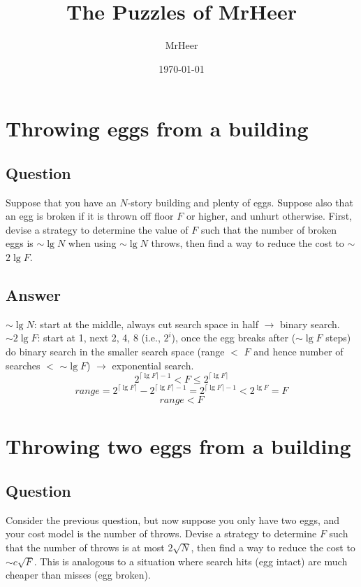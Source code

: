 \documentclass[12pt]{article}
\title{The Puzzles of MrHeer}
\author{MrHeer}
\date{\today}
\numberwithin{equation}{section}
\begin{document}
\begin{titlepage}
    \maketitle
    \thispagestyle{empty}
\end{titlepage}

\begin{center}
    \tableofcontents
\end{center}

\newpage
{}
\setcounter{page}{1}

\section{Throwing eggs from a building}
\subsection*{Question}
Suppose that you have an $N$-story building and
plenty of eggs. Suppose also that an egg is broken if it is thrown off floor $F$ or higher,
and unhurt otherwise. First, devise a strategy to determine the value of $F$ such that the
number of broken eggs is $\sim$$\lg{N}$ when using $\sim$$\lg{N}$ throws, then find a way to reduce the
cost to $\sim$$2\lg{F}$.
\subsection*{Answer}
$\sim$$\lg{N}$: start at the middle, always cut search space in half $\rightarrow$ binary search.\\
$\sim$$2\lg{F}$: start at 1, next 2, 4, 8 (i.e., $2^i$), once the egg breaks after ($\sim$$\lg{F}$ steps)
do binary search in the smaller search space (range $<$ $F$ and hence number of searches $<$ $\sim$$\lg{F}$)
$\rightarrow$ exponential search.
\[2^{\lceil \lg{F} \rceil - 1} < F \leqslant 2^{\lceil \lg{F} \rceil}\]
\[range = 2^{\lceil \lg{F} \rceil} - 2^{\lceil \lg{F} \rceil - 1}
= 2^{\lceil \lg{F} \rceil - 1} < 2^{\lg{F}} = F\]
\[range < F\]

\newpage
\section{Throwing two eggs from a building}
\subsection*{Question}
Consider the previous question, but now
suppose you only have two eggs, and your cost model is the number of throws. Devise
a strategy to determine $F$ such that the number of throws is at most $2\sqrt{N}$, then find a
way to reduce the cost to $\sim$$c\sqrt{F}$. This is analogous to a situation where search hits (egg
intact) are much cheaper than misses (egg broken).
\end{document}
